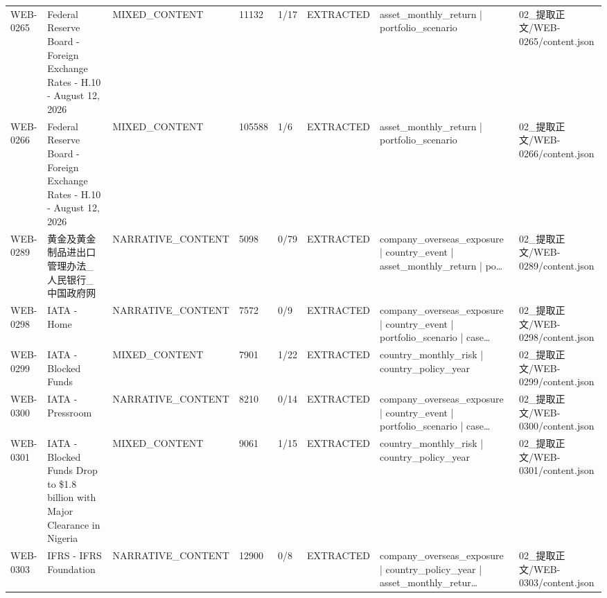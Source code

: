 \begin{landscape}
\begin{longtable}{p{1.8cm}p{4.2cm}p{3.0cm}p{1.4cm}p{1.6cm}p{2.4cm}p{4.2cm}p{4.2cm}}
WEB-0265 & Federal Reserve Board - Foreign Exchange Rates - H.10 - August 12, 2026 & MIXED\_\allowbreak{}CONTENT & 11132 & 1/\allowbreak{}17 & EXTRACTED & asset\_\allowbreak{}monthly\_\allowbreak{}return | portfolio\_\allowbreak{}scenario & 02\_\allowbreak{}提取正文/\allowbreak{}WEB-0265/\allowbreak{}content.json\\
WEB-0266 & Federal Reserve Board - Foreign Exchange Rates - H.10 - August 12, 2026 & MIXED\_\allowbreak{}CONTENT & 105588 & 1/\allowbreak{}6 & EXTRACTED & asset\_\allowbreak{}monthly\_\allowbreak{}return | portfolio\_\allowbreak{}scenario & 02\_\allowbreak{}提取正文/\allowbreak{}WEB-0266/\allowbreak{}content.json\\
WEB-0289 & 黄金及黄金制品进出口管理办法\_\allowbreak{}人民银行\_\allowbreak{}中国政府网 & NARRATIVE\_\allowbreak{}CONTENT & 5098 & 0/\allowbreak{}79 & EXTRACTED & company\_\allowbreak{}overseas\_\allowbreak{}exposure | country\_\allowbreak{}event | asset\_\allowbreak{}monthly\_\allowbreak{}return | po… & 02\_\allowbreak{}提取正文/\allowbreak{}WEB-0289/\allowbreak{}content.json\\
WEB-0298 & IATA - Home & NARRATIVE\_\allowbreak{}CONTENT & 7572 & 0/\allowbreak{}9 & EXTRACTED & company\_\allowbreak{}overseas\_\allowbreak{}exposure | country\_\allowbreak{}event | portfolio\_\allowbreak{}scenario | case… & 02\_\allowbreak{}提取正文/\allowbreak{}WEB-0298/\allowbreak{}content.json\\
WEB-0299 & IATA - Blocked Funds & MIXED\_\allowbreak{}CONTENT & 7901 & 1/\allowbreak{}22 & EXTRACTED & country\_\allowbreak{}monthly\_\allowbreak{}risk | country\_\allowbreak{}policy\_\allowbreak{}year & 02\_\allowbreak{}提取正文/\allowbreak{}WEB-0299/\allowbreak{}content.json\\
WEB-0300 & IATA - Pressroom & NARRATIVE\_\allowbreak{}CONTENT & 8210 & 0/\allowbreak{}14 & EXTRACTED & company\_\allowbreak{}overseas\_\allowbreak{}exposure | country\_\allowbreak{}event | portfolio\_\allowbreak{}scenario | case… & 02\_\allowbreak{}提取正文/\allowbreak{}WEB-0300/\allowbreak{}content.json\\
WEB-0301 & IATA - Blocked Funds Drop to \$1.8 billion with Major Clearance in Nigeria & MIXED\_\allowbreak{}CONTENT & 9061 & 1/\allowbreak{}15 & EXTRACTED & country\_\allowbreak{}monthly\_\allowbreak{}risk | country\_\allowbreak{}policy\_\allowbreak{}year & 02\_\allowbreak{}提取正文/\allowbreak{}WEB-0301/\allowbreak{}content.json\\
WEB-0303 & IFRS - IFRS Foundation & NARRATIVE\_\allowbreak{}CONTENT & 12900 & 0/\allowbreak{}8 & EXTRACTED & company\_\allowbreak{}overseas\_\allowbreak{}exposure | country\_\allowbreak{}policy\_\allowbreak{}year | asset\_\allowbreak{}monthly\_\allowbreak{}retur… & 02\_\allowbreak{}提取正文/\allowbreak{}WEB-0303/\allowbreak{}content.json\\

\end{longtable}
\end{landscape}
